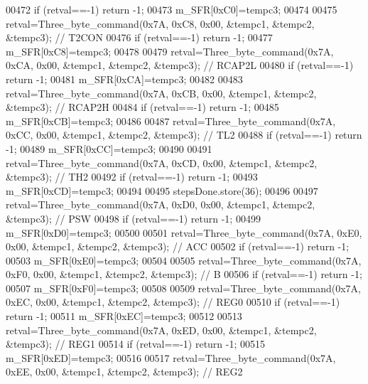 \begin{DoxyCode}
{{00472     \textcolor{keywordflow}{if} (retval==-1) \textcolor{keywordflow}{return} -1;
00473     m\_SFR[0xC0]=tempc3;
00474 
00475     retval=Three\_byte\_command(0x7A, 0xC8, 0x00, &tempc1, &tempc2, &tempc3); \textcolor{comment}{// T2CON}
00476     \textcolor{keywordflow}{if} (retval==-1) \textcolor{keywordflow}{return} -1;
00477     m\_SFR[0xC8]=tempc3;
00478 
00479     retval=Three\_byte\_command(0x7A, 0xCA, 0x00, &tempc1, &tempc2, &tempc3); \textcolor{comment}{// RCAP2L}
00480     \textcolor{keywordflow}{if} (retval==-1) \textcolor{keywordflow}{return} -1;
00481     m\_SFR[0xCA]=tempc3;
00482 
00483     retval=Three\_byte\_command(0x7A, 0xCB, 0x00, &tempc1, &tempc2, &tempc3); \textcolor{comment}{// RCAP2H}
00484     \textcolor{keywordflow}{if} (retval==-1) \textcolor{keywordflow}{return} -1;
00485     m\_SFR[0xCB]=tempc3;
00486 
00487     retval=Three\_byte\_command(0x7A, 0xCC, 0x00, &tempc1, &tempc2, &tempc3); \textcolor{comment}{// TL2}
00488     \textcolor{keywordflow}{if} (retval==-1) \textcolor{keywordflow}{return} -1;
00489     m\_SFR[0xCC]=tempc3;
00490 
00491     retval=Three\_byte\_command(0x7A, 0xCD, 0x00, &tempc1, &tempc2, &tempc3); \textcolor{comment}{// TH2}
00492     \textcolor{keywordflow}{if} (retval==-1) \textcolor{keywordflow}{return} -1;
00493     m\_SFR[0xCD]=tempc3;
00494 
00495     stepsDone.store(36);
00496 
00497     retval=Three\_byte\_command(0x7A, 0xD0, 0x00, &tempc1, &tempc2, &tempc3); \textcolor{comment}{// PSW}
00498     \textcolor{keywordflow}{if} (retval==-1) \textcolor{keywordflow}{return} -1;
00499     m\_SFR[0xD0]=tempc3;
00500 
00501     retval=Three\_byte\_command(0x7A, 0xE0, 0x00, &tempc1, &tempc2, &tempc3); \textcolor{comment}{// ACC}
00502     \textcolor{keywordflow}{if} (retval==-1) \textcolor{keywordflow}{return} -1;
00503     m\_SFR[0xE0]=tempc3;
00504 
00505     retval=Three\_byte\_command(0x7A, 0xF0, 0x00, &tempc1, &tempc2, &tempc3); \textcolor{comment}{// B}
00506     \textcolor{keywordflow}{if} (retval==-1) \textcolor{keywordflow}{return} -1;
00507     m\_SFR[0xF0]=tempc3;
00508 
00509     retval=Three\_byte\_command(0x7A, 0xEC, 0x00, &tempc1, &tempc2, &tempc3); \textcolor{comment}{// REG0}
00510     \textcolor{keywordflow}{if} (retval==-1) \textcolor{keywordflow}{return} -1;
00511     m\_SFR[0xEC]=tempc3;
00512 
00513     retval=Three\_byte\_command(0x7A, 0xED, 0x00, &tempc1, &tempc2, &tempc3); \textcolor{comment}{// REG1}
00514     \textcolor{keywordflow}{if} (retval==-1) \textcolor{keywordflow}{return} -1;
00515     m\_SFR[0xED]=tempc3;
00516 
00517     retval=Three\_byte\_command(0x7A, 0xEE, 0x00, &tempc1, &tempc2, &tempc3); \textcolor{comment}{// REG2}
}}
\end{DoxyCode}

